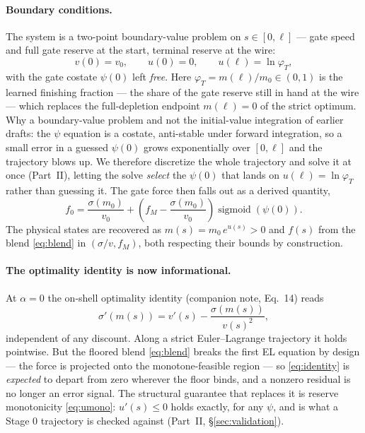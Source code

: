 \documentclass[11pt]{article}
\DeclareMathOperator{\sigmoid}{sigmoid}
\begin{document}
\paragraph{Boundary conditions.} The system is a two-point boundary-value problem on $s \in [0, \ell]$ --- gate speed and full gate reserve at the start, terminal reserve at the wire:
\begin{equation}\label{eq:bc}
v(0) = v_0, \qquad u(0) = 0, \qquad u(\ell) = \ln \varphi_T,
\end{equation}
with the gate costate $\psi(0)$ left \emph{free}. Here $\varphi_T = m(\ell)/m_0 \in (0, 1)$ is the learned finishing fraction --- the share of the gate reserve still in hand at the wire --- which replaces the full-depletion endpoint $m(\ell) = 0$ of the strict optimum. Why a boundary-value problem and not the initial-value integration of earlier drafts: the $\psi$ equation is a costate, anti-stable under forward integration, so a small error in a guessed $\psi(0)$ grows exponentially over $[0, \ell]$ and the trajectory blows up. We therefore discretize the whole trajectory and solve it at once (Part~II), letting the solve \emph{select} the $\psi(0)$ that lands on $u(\ell) = \ln\varphi_T$ rather than guessing it. The gate force then falls out as a derived quantity,
\begin{equation}\label{eq:f0-derived}
f_0 = \frac{\sigma(m_0)}{v_0} + \left(f_M - \frac{\sigma(m_0)}{v_0}\right)\sigmoid(\psi(0)).
\end{equation}
The physical states are recovered as $m(s) = m_0\, e^{u(s)} > 0$ and $f(s)$ from the blend \eqref{eq:blend} in $(\sigma/v, f_M)$, both respecting their bounds by construction.

\paragraph{The optimality identity is now informational.} At $\alpha = 0$ the on-shell optimality identity (companion note, Eq.~14) reads
\begin{equation}\label{eq:identity}
\sigma'(m(s)) = v'(s) - \frac{\sigma(m(s))}{v(s)^2},
\end{equation}
independent of any discount. Along a strict Euler--Lagrange trajectory it holds pointwise. But the floored blend \eqref{eq:blend} breaks the first EL equation by design --- the force is projected onto the monotone-feasible region --- so \eqref{eq:identity} is \emph{expected} to depart from zero wherever the floor binds, and a nonzero residual is no longer an error signal. The structural guarantee that replaces it is reserve monotonicity \eqref{eq:umono}: $u'(s) \leq 0$ holds exactly, for any $\psi$, and is what a Stage 0 trajectory is checked against (Part~II, \S\ref{sec:validation}).
\end{document}
